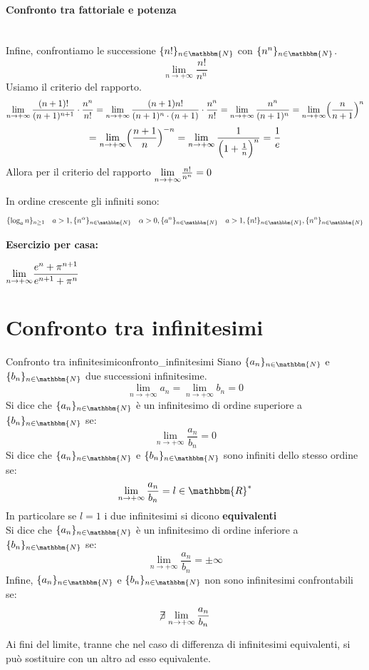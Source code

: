 \documentclass[12pt]{report}
\newcounter{definition}
\newcommand{\nmu}{}
\begin{document}
	\paragraph{Confronto tra fattoriale e potenza} \quad \\
	Infine, confrontiamo le successione $\{n!\}_{n \in \mathbbm{N}}$ con $\{n^n\}_{n \in \mathbbm{N}}$. \\
	\[
	\lim_{n \to +\infty}\frac{n!}{n^n}
	\]
	Usiamo il criterio del rapporto.
	\[
	\lim_{n \to +\infty}\frac{(n+1)!}{(n+1)^{n + 1}} \cdot \frac{n^n}{n!} = \lim_{n \to +\infty}\frac{(n + 1)n!}{(n + 1)^n \cdot (n + 1)} \cdot \frac{n^n}{n!} = \lim_{n \to +\infty}\frac{n^n}{(n + 1)^n} = \lim_{n \to +\infty}\Bigl(\frac{n}{n + 1}\Bigr)^n
	\]
	\[
	= \lim_{n \to +\infty}\Bigl(\frac{n + 1}{n}\Big)^{-n} = \lim_{n \to +\infty}\frac{1}{\Bigl(1 + \frac{1}{n}\Bigr)^n} = \frac{1}{e}
	\]
	Allora per il criterio del rapporto $\mathlarger{\lim_{n \to +\infty}}\frac{n!}{n^n} = 0$
	\begin{note}{}{}
		In ordine crescente gli infiniti sono:
		\[
		\{\log_{a}n\}_{n \geq 1} \quad a > 1, \{n^\alpha\}_{n \in \mathbbm{N}} \quad \alpha > 0, \{a^n\}_{n \in \mathbbm{N}} \quad a > 1, \{n!\}_{n \in \mathbbm{N}}, \{n^n\}_{n \in \mathbbm{N}}
		\]
	\end{note}
	\textbf{Esercizio per casa:} \\
	\begin{assignment}{}{}
		$\mathlarger{\lim_{n \to +\infty}}\dfrac{e^n + \pi^{n + 1}}{e^{n + 1} + \pi^n}$
	\end{assignment}
	\section{Confronto tra infinitesimi}
	\begin{definition}{\nmu Confronto tra infinitesimi}{confronto_infinitesimi}
		Siano $\{a_n\}_{n \in \mathbbm{N}}$ e $\{b_n\}_{n \in \mathbbm{N}}$ due successioni infinitesime.
		\[
		\lim_{n \to +\infty}a_n=\lim_{n \to +\infty}b_n=0
		\]
		Si dice che $\{a_n\}_{n \in \mathbbm{N}}$ è un infinitesimo di ordine superiore a $\{b_n\}_{n\in\mathbbm{N}}$ se:
		\[
		\lim_{n \to +\infty}\frac{a_n}{b_n}=0
		\]
		Si dice che $\{a_n\}_{n \in \mathbbm{N}}$ e $\{b_n\}_{n \in \mathbbm{N}}$ sono infiniti dello stesso ordine se:
		\[
		\lim_{n \to +\infty}\frac{a_n}{b_n} = l \in \mathbbm{R}^*
		\]
		In particolare se $l = 1$ i due infinitesimi si dicono \textbf{equivalenti} \\
		Si dice che $\{a_n\}_{n \in \mathbbm{N}}$ è un infinitesimo di ordine inferiore a $\{b_n\}_{n\in\mathbbm{N}}$ se:
		\[
		\lim_{n \to +\infty}\frac{a_n}{b_n} = \pm\infty
		\]
		Infine, $\{a_n\}_{n \in \mathbbm{N}}$ e $\{b_n\}_{n \in \mathbbm{N}}$ non sono infinitesimi confrontabili se:
		\[
		\centernot{\exists} \lim_{n \to +\infty}\frac{a_n}{b_n}
		\]
	\end{definition}
	\begin{note}{}{}
		Ai fini del limite, tranne che nel caso di differenza di infinitesimi equivalenti, si può sostituire con un altro ad esso equivalente.
	\end{note}
\end{document}
